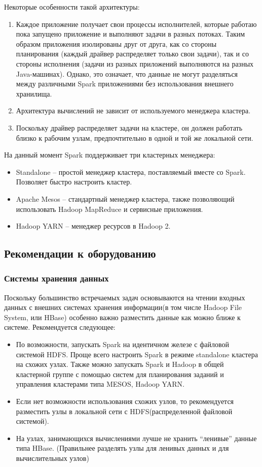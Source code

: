 \documentclass[12pt,a4paper]{report}
\begin{document}
\noindent Некоторые особенности такой архитектуры:
\begin{enumerate}
\setlength\itemsep{0em}
\item Каждое приложение получает свои процессы исполнителей, которые работаю пока запущено приложение и выполняют задачи в разных потоках. Таким образом приложения изолированы друг от друга, как со стороны планирования (каждый драйвер распределяет только свои задачи), так и со стороны исполнения (задачи из разных приложений выполняются на разных Java-машинах). Однако, это означает, что данные не могут разделяться между различными Spark приложениями без использования внешнего хранилища. 
\item Архитектура вычислений не зависит от используемого менеджера кластера. 
\item Поскольку драйвер распределяет задачи на кластере, он должен работать близко к рабочим узлам, предпочтительно в одной и той же локальной сети. 
\end{enumerate}
На данный момент Spark поддерживает три кластерных менеджера: 
\begin{itemize}
\setlength\itemsep{0em}
\item Standalone – простой менеджер кластера, поставляемый вместе со Spark. Позволяет быстро настроить кластер.
\item Apache Mesos – стандартный менеджер кластера, также позволяющий использовать Hadoop MapReduce и сервисные приложения.
\item Hadoop YARN – менеджер ресурсов в Hadoop 2.
\end{itemize}

\subsection{Рекомендации к оборудованию} 

\subsubsection{Системы хранения данных} 

Поскольку большинство встречаемых задач основываются на чтении входных данных с внешних системах хранения информации(в том числе Hadoop File System, или HBase) особенно важно разместить данные как можно ближе к системе. Рекомендуется следующее:
\begin{itemize}
\setlength\itemsep{0em}
\item По возможности, запускать Spark на идентичном железе с файловой системой HDFS. Проще всего настроить Spark в режиме standalone кластера на схожих узлах.  Также можно запускать Spark и Hadoop в общей кластерной группе с помощью систем для планирования заданий и управления кластерами типа MESOS,  Hadoop YARN.
\item Если нет возможности использования схожих узлов, то рекомендуется разместить узлы в локальной сети с HDFS(распределенной файловой системой).
\item На узлах, занимающихся вычислениями лучше не хранить “ленивые” данные типа HBase. (Правильнее разделять узлы для ленивых данных и для вычислительных узлов)
\end{itemize}
\end{document}
